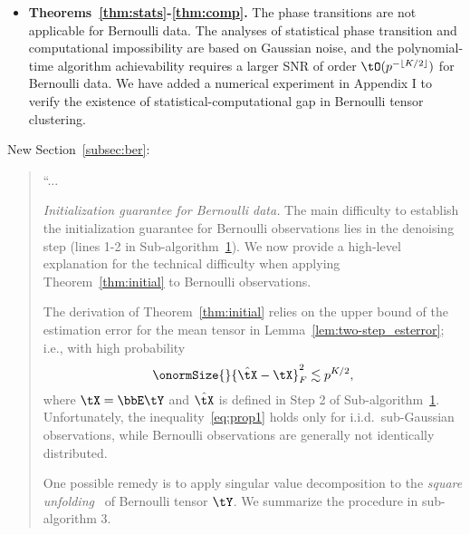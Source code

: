 \documentclass[11pt]{article}
\theoremstyle{definition}
\theoremstyle{definition}
\DeclarePairedDelimiter{\floor}{\lfloor}{\rfloor}
\begin{document}
\begin{enumerate}[wide, labelwidth=!, labelindent=0pt]
\begin{enumerate}
\begin{itemize}
\item {\bf Theorems~\ref{thm:stats}-\ref{thm:comp}.} The phase transitions are not applicable for Bernoulli data. The analyses of statistical phase transition and computational impossibility are based on Gaussian noise, and the polynomial-time algorithm achievability requires a larger SNR of order $\tO(p^{-\floor{K/2}})$ for Bernoulli data. We have added a numerical experiment in Appendix I to verify the existence of statistical-computational gap in Bernoulli tensor clustering. 
\end{itemize}

New Section~\ref{subsec:ber}: 
\begin{quote}
    ``...
    
    \textit{Initialization guarantee for Bernoulli data.} The main difficulty to establish the initialization guarantee for Bernoulli observations lies in the denoising step (lines 1-2 in Sub-algorithm~\hyperref[alg:main]{1}). We now provide a high-level explanation for the technical difficulty when applying Theorem~\ref{thm:initial} to Bernoulli observations. 
    
    
    The derivation of Theorem~\ref{thm:initial} relies on the upper bound of the estimation error for the mean tensor in Lemma~\ref{lem:two-step_esterror}; i.e., with high probability
\begin{equation}\label{eq:prop1}
    \onormSize{}{\hat \tX - \tX}_F^2 \lesssim p^{K/2},
\end{equation}
where $\tX = \bbE\tY$ and $\hat \tX$ is defined in Step 2 of Sub-algorithm~\hyperref[alg:main]{1}. Unfortunately, the inequality~\eqref{eq:prop1} holds only for i.i.d.\ sub-Gaussian observations, while Bernoulli observations are generally not identically distributed.  

One possible remedy is to apply singular value decomposition to the \emph{square unfolding}~\citep{mu2014square} of Bernoulli tensor $\tY$. We summarize the procedure in sub-algorithm 3.


\end{quote}
\end{enumerate}
\end{enumerate}
\end{document}
